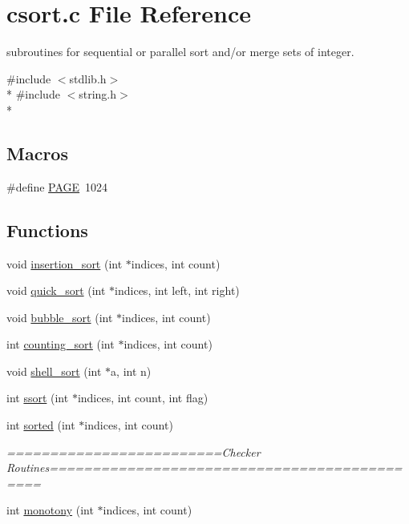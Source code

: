 \section{csort.\-c File Reference}
\label{csort_8c}


subroutines for sequential or parallel sort and/or merge sets of integer.  


{\ttfamily \#include $<$stdlib.\-h$>$}\\*
{\ttfamily \#include $<$string.\-h$>$}\\*
\subsection*{Macros}
\begin{DoxyCompactItemize}
\item 
\#define \hyperlink{csort_8c_a81cb74761d269ea2740e5df37fbf4847}{P\-A\-G\-E}~1024
\end{DoxyCompactItemize}
\subsection*{Functions}
\begin{DoxyCompactItemize}
\item 
void \hyperlink{csort_8c_ac6de80e538f1108a2998b3afb8b24315}{insertion\-\_\-sort} (int $\ast$indices, int count)
\item 
void \hyperlink{csort_8c_ac90bc341ecc4719311c092119fc92b8b}{quick\-\_\-sort} (int $\ast$indices, int left, int right)
\item 
void \hyperlink{csort_8c_ad4db1ee6ea572c037e2c4f67a5cc1d64}{bubble\-\_\-sort} (int $\ast$indices, int count)
\item 
int \hyperlink{csort_8c_a7691b4dfa7a8b0ef434c241b83131310}{counting\-\_\-sort} (int $\ast$indices, int count)
\item 
void \hyperlink{csort_8c_a9b0b0f9188bac9f84cc3d0316cfbb261}{shell\-\_\-sort} (int $\ast$a, int n)
\item 
int \hyperlink{csort_8c_a132957cdd06b08ad58760aab421bc3e1}{ssort} (int $\ast$indices, int count, int flag)
\item 
int \hyperlink{csort_8c_a9a3104ca89364fc8d56314acdf020ba1}{sorted} (int $\ast$indices, int count)
\begin{DoxyCompactList}\small\item\em =========================Checker Routines============================================= \end{DoxyCompactList}\item 
int \hyperlink{csort_8c_aa86548b3a11f3fe40aaee0bb6f655706}{monotony} (int $\ast$indices, int count)
\end{DoxyCompactItemize}


